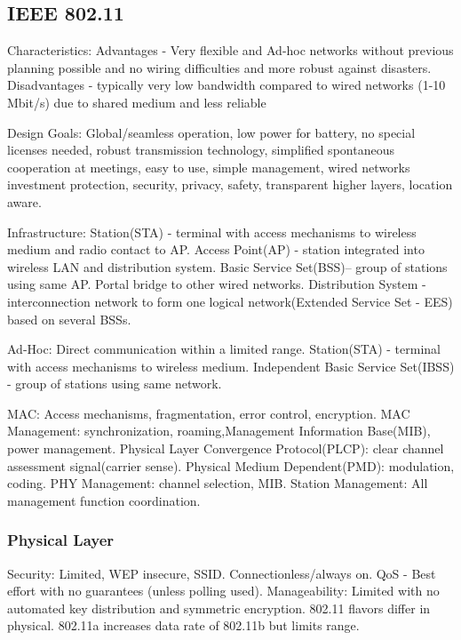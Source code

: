 \documentclass[8pt]{extarticle}
\begin{document}
\begin{multicols}{2}
\subsection{IEEE 802.11}

Characteristics:  Advantages - Very flexible and Ad-hoc networks without previous planning possible and no wiring difficulties and more robust against disasters. Disadvantages - typically very low bandwidth compared to wired networks (1-10 Mbit/s) due to shared medium and less reliable

Design Goals: Global/seamless operation, low power for battery, no special licenses needed, robust transmission technology, simplified spontaneous cooperation at meetings, easy to use, simple management, wired networks investment protection, security, privacy, safety, transparent higher layers, location aware.

Infrastructure: Station(STA) - terminal with access mechanisms to wireless medium and radio contact to AP. Access Point(AP) - station integrated into wireless LAN and distribution system. Basic Service Set(BSS)– group of stations using same AP. Portal bridge to other wired networks. Distribution System - interconnection network to form one logical network(Extended Service Set - EES) based on several BSSs.

Ad-Hoc: Direct communication within a limited range. Station(STA) - terminal with access mechanisms to wireless medium. Independent Basic Service Set(IBSS) - group of stations using same network.

MAC: Access mechanisms, fragmentation, error control, encryption. MAC Management: synchronization, roaming,Management Information Base(MIB), power management. Physical Layer Convergence Protocol(PLCP): clear channel assessment signal(carrier sense).  Physical Medium Dependent(PMD): modulation, coding. PHY Management: channel selection, MIB. Station Management: All
management function coordination.

\subsubsection{Physical Layer}

Security: Limited, WEP insecure, SSID. Connectionless/always on. QoS - Best effort with no guarantees (unless polling used). Manageability: Limited with no automated key distribution and symmetric encryption. 802.11 flavors differ in physical. 802.11a increases data rate of 802.11b but limits range. 


\end{multicols}
\end{document}
